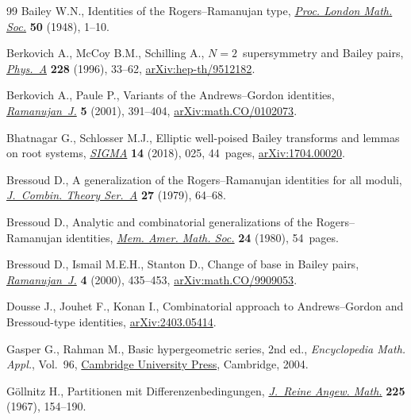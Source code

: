 \documentclass[pdftex]{sigma}
\numberwithin{equation}{section}
\begin{document}
\begin{thebibliography}{99}
Bailey W.N., Identities of the {R}ogers--{R}amanujan type, \href{https://doi.org/10.1112/plms/s2-50.1.1}{\textit{Proc. London
 Math. Soc.}} \textbf{50} (1948), 1--10.

Berkovich A., McCoy B.M., Schilling A., {$N=2$}~supersymmetry and {B}ailey
 pairs, \href{https://doi.org/10.1016/S0378-4371(96)00054-4}{\textit{Phys.~A}} \textbf{228} (1996), 33--62, \href{https://arxiv.org/abs/hep-th/9512182}{arXiv:hep-th/9512182}.

Berkovich A., Paule P., Variants of the {A}ndrews--{G}ordon identities,
 \href{https://doi.org/10.1023/A:1013995805667}{\textit{Ramanujan~J.}} \textbf{5} (2001), 391--404, \href{https://arxiv.org/abs/math.CO/0102073}{arXiv:math.CO/0102073}.

Bhatnagar G., Schlosser M.J., Elliptic well-poised {B}ailey transforms and
 lemmas on root systems, \href{https://doi.org/10.3842/SIGMA.2018.025}{\textit{SIGMA}} \textbf{14} (2018), 025, 44~pages,
 \href{https://arxiv.org/abs/1704.00020}{arXiv:1704.00020}.

Bressoud D., A generalization of the {R}ogers--{R}amanujan identities for all
 moduli, \href{https://doi.org/10.1016/0097-3165(79)90008-6}{\textit{J.~Combin. Theory Ser.~A}} \textbf{27} (1979), 64--68.

Bressoud D., Analytic and combinatorial generalizations of the
 {R}ogers--{R}amanujan identities, \href{https://doi.org/10.1090/memo/0227}{\textit{Mem. Amer. Math. Soc.}} \textbf{24}
 (1980), 54~pages.

Bressoud D., Ismail M.E.H., Stanton D., Change of base in {B}ailey pairs,
 \href{https://doi.org/10.1023/A:1009824218230}{\textit{Ramanujan~J.}} \textbf{4} (2000), 435--453, \href{https://arxiv.org/abs/math.CO/9909053}{arXiv:math.CO/9909053}.

Dousse J., Jouhet F., Konan I., Combinatorial approach to {A}ndrews--{G}ordon
 and {B}ressoud-type identities, \href{https://arxiv.org/abs/2403.05414}{arXiv:2403.05414}.

Gasper G., Rahman M., Basic hypergeometric series, 2nd ed., \textit{Encyclopedia Math.
 Appl.}, Vol.~96, \href{https://doi.org/10.1017/CBO9780511526251}{Cambridge University Press}, Cambridge, 2004.

G\"ollnitz H., Partitionen mit {D}ifferenzenbedingungen, \href{https://doi.org/10.1515/crll.1967.225.154}{\textit{J.~Reine
 Angew. Math.}} \textbf{225} (1967), 154--190.


\end{thebibliography}
\end{document}
